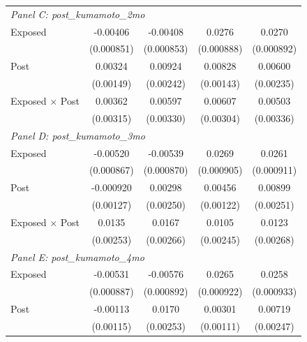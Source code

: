 \begin{table}[htbp]
\begin{tabular}{l*{4}{c}}
\\[0.1cm]
\midrule


\multicolumn{5}{l}{\textit{Panel C: post\_kumamoto\_2mo}}\\

Exposed
&-0.00406\sym{***}
&-0.00408\sym{***}
&0.0276\sym{***}
&0.0270\sym{***}
\\
&(0.000851)&(0.000853)&(0.000888)&(0.000892)
\\

Post
&0.00324\sym{**}
&0.00924\sym{***}
&0.00828\sym{***}
&0.00600\sym{**}
\\
&(0.00149)&(0.00242)&(0.00143)&(0.00235)
\\

Exposed $\times$ Post
&0.00362
&0.00597\sym{*}
&0.00607\sym{**}
&0.00503
\\
&(0.00315)&(0.00330)&(0.00304)&(0.00336)

\\[0.1cm]
\midrule


\multicolumn{5}{l}{\textit{Panel D: post\_kumamoto\_3mo}}\\

Exposed
&-0.00520\sym{***}
&-0.00539\sym{***}
&0.0269\sym{***}
&0.0261\sym{***}
\\
&(0.000867)&(0.000870)&(0.000905)&(0.000911)
\\

Post
&-0.000920
&0.00298
&0.00456\sym{***}
&0.00899\sym{***}
\\
&(0.00127)&(0.00250)&(0.00122)&(0.00251)
\\

Exposed $\times$ Post
&0.0135\sym{***}
&0.0167\sym{***}
&0.0105\sym{***}
&0.0123\sym{***}
\\
&(0.00253)&(0.00266)&(0.00245)&(0.00268)

\\[0.1cm]
\midrule


\multicolumn{5}{l}{\textit{Panel E: post\_kumamoto\_4mo}}\\

Exposed
&-0.00531\sym{***}
&-0.00576\sym{***}
&0.0265\sym{***}
&0.0258\sym{***}
\\
&(0.000887)&(0.000892)&(0.000922)&(0.000933)
\\

Post
&-0.00113
&0.0170\sym{***}
&0.00301\sym{***}
&0.00719\sym{***}
\\
&(0.00115)&(0.00253)&(0.00111)&(0.00247)
\\


\end{tabular}
\end{table}

